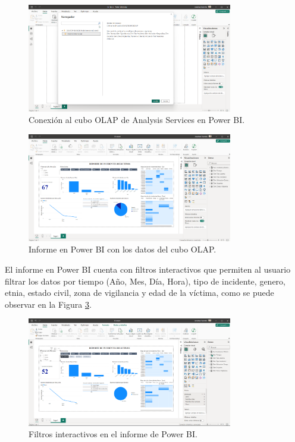 \begin{figure}[H]
    \centering
    \includegraphics[width=0.8\textwidth]{chapters/III-resultados-y-discusion/resources/images/conexion-bi.png}
    \caption{Conexión al cubo OLAP de Analysis Services en Power BI.}
    \label{fig:conexion-bi}
\end{figure}

\begin{figure}[H]
    \centering
    \includegraphics[width=0.8\textwidth]{chapters/III-resultados-y-discusion/resources/images/informe-bi.png}
    \caption{Informe en Power BI con los datos del cubo OLAP.}
    \label{fig:informe-bi}
\end{figure}

El informe en Power BI cuenta con filtros interactivos que permiten al usuario filtrar los datos por tiempo (Año, Mes, Día, Hora), tipo de
incidente, genero, etnia, estado civil, zona de vigilancia y edad de la víctima, como se puede observar en la Figura \ref{fig:filtros-bi}.

\begin{figure}[H]
    \centering
    \includegraphics[width=0.8\textwidth]{chapters/III-resultados-y-discusion/resources/images/filtros-bi.png}
    \caption{Filtros interactivos en el informe de Power BI.}
    \label{fig:filtros-bi}
\end{figure}

